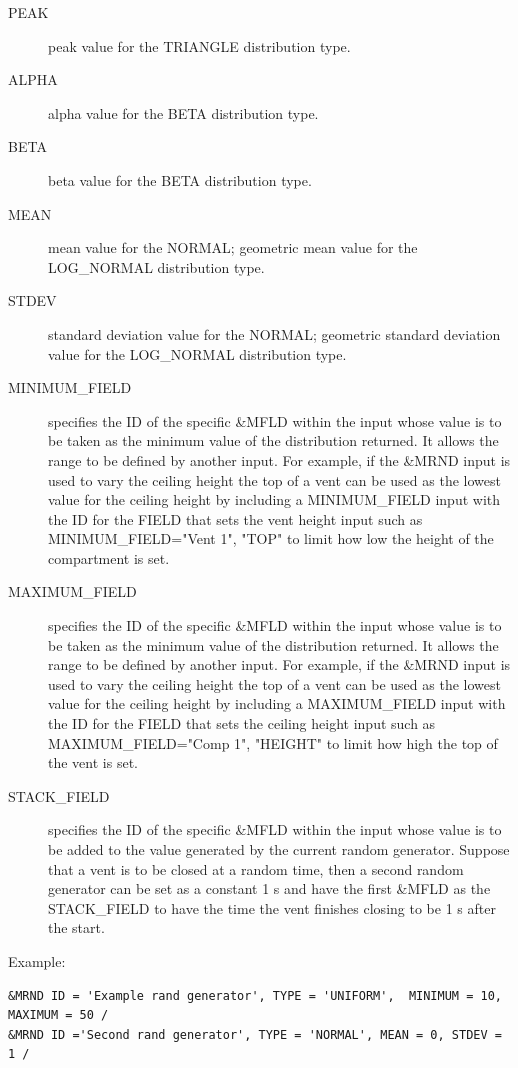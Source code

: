 \documentclass[12pt,twoside]{book}
\begin{document}
\begin{description}
  \item[PEAK] peak value for the {\ct TRIANGLE} distribution type.
  \item[ALPHA] alpha value for the {\ct BETA} distribution type.
  \item[BETA] beta value for the {\ct BETA} distribution type.
  \item[MEAN] mean value for the {\ct NORMAL}; geometric mean value for the {\ct LOG\_NORMAL} distribution type.
  \item[STDEV] standard deviation value for the {\ct NORMAL}; geometric standard deviation value for the {\ct LOG\_NORMAL} distribution type.
  \item[MINIMUM\_FIELD] specifies the ID of the specific \&MFLD within the input whose value is to be taken as the minimum value of the distribution returned. It allows the range to be defined by another input. For example, if the {\ct \&MRND} input is used to vary the ceiling height the top of a vent can be used as the lowest value for the ceiling height by including a {\ct MINIMUM\_FIELD} input with the {\ct ID} for the {\ct FIELD} that sets the vent height input such as {\ct MINIMUM\_FIELD="Vent 1", "TOP"} to limit how low the height of the compartment is set.
  \item[MAXIMUM\_FIELD] specifies the  ID of the specific \&MFLD  within the input whose value is to be taken as the minimum value of the distribution returned. It allows the range to be defined by another input. For example, if the {\ct \&MRND} input is used to vary the ceiling height the top of a vent can be used as the lowest value for the ceiling height by including a {\ct MAXIMUM\_FIELD} input with the {\ct ID} for the {\ct FIELD} that sets the ceiling height input such as {\ct MAXIMUM\_FIELD="Comp 1", "HEIGHT"} to limit how high the top of the vent is set.
  \item[STACK\_FIELD] specifies the  ID of the specific \&MFLD  within the input whose value is to be added to the value generated by the current random generator. Suppose that a vent is to be closed at a random time, then a second random generator can be set as a constant 1 s and have the first \&MFLD as the STACK\_FIELD  to have the time the vent finishes closing to be 1 s after the start.
\end{description}

\vspace{\baselineskip}
\noindent Example:
\begin{lstlisting}
&MRND ID = 'Example rand generator', TYPE = 'UNIFORM',  MINIMUM = 10, MAXIMUM = 50 /
&MRND ID ='Second rand generator', TYPE = 'NORMAL', MEAN = 0, STDEV = 1 /
\end{lstlisting}
\end{document}
